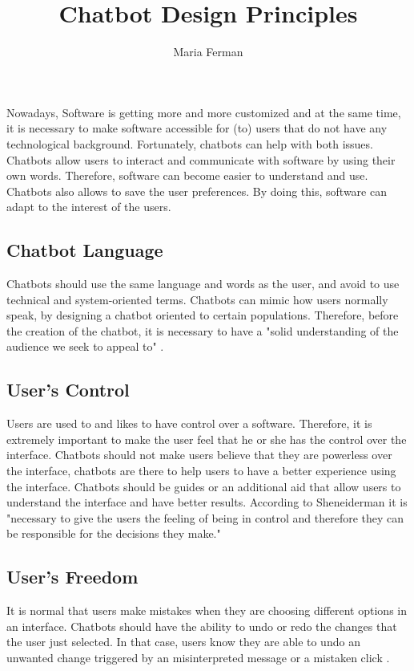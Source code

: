 \documentclass[a4paper,10pt]{article}
\title{Chatbot Design Principles}
\author{Maria Ferman}
\begin{document}
\maketitle

Nowadays, Software is getting more and more customized and at the same time, it is necessary to make software accessible for (to) users that do not have any technological background. Fortunately, chatbots can help with both issues. Chatbots allow users to interact and communicate with software by using their own words. Therefore, software can become easier to understand and use. Chatbots also allows to save the user preferences. By doing this, software can adapt to the interest of the users.   

\subsection*{Chatbot Language}

Chatbots should use the same language and words as the user, and avoid to use technical and system-oriented terms. Chatbots can mimic how users normally speak, by designing a chatbot oriented to certain populations. Therefore, before the creation of the chatbot, it is necessary to have a "solid understanding of the audience we seek to appeal to" \cite{HeuristicsWebPage}.  

\subsection*{User's Control}

Users are used to and likes to have control over a software. Therefore, it is extremely important to make the user feel that he or she has the control over the interface. Chatbots should not make users believe that they are powerless over the interface, chatbots are there to help users to have a better experience using the interface. Chatbots should be guides or an additional aid that allow users to understand the interface and have better results. According to Sheneiderman \cite{shneiderman1997direct} it is "necessary to give the users the feeling of being in control and therefore they can be responsible for the decisions they make."  

\subsection*{User's Freedom}

It is normal that users make mistakes when they are choosing different options in an interface. Chatbots should have the ability to undo or redo the changes that the user just selected. In that case, users know they are able to undo an unwanted change triggered by an misinterpreted message or a mistaken click \cite{HeuristicsWebPage}.
\end{document}
